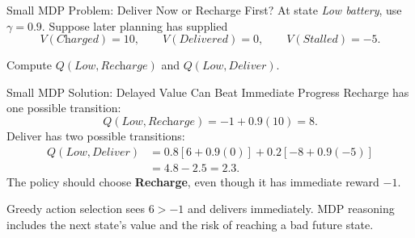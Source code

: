 \documentclass[aspectratio=169,10pt]{beamer}
\begin{document}
\begin{frame}{Small MDP Problem: Deliver Now or Recharge First?}
  At state \textit{Low battery}, use $\gamma=0.9$. Suppose later planning has supplied
  \[
    V(\textit{Charged})=10,\qquad V(\textit{Delivered})=0,\qquad V(\textit{Stalled})=-5.
  \]
  \begin{center}
  \end{center}
  Compute $Q(\textit{Low},\textit{Recharge})$ and $Q(\textit{Low},\textit{Deliver})$.
\end{frame}

\begin{frame}{Small MDP Solution: Delayed Value Can Beat Immediate Progress}
  \small
  Recharge has one possible transition:
  \[
    Q(\textit{Low},\textit{Recharge})=-1+0.9(10)=8.
  \]
  Deliver has two possible transitions:
  \[
  \begin{aligned}
    Q(\textit{Low},\textit{Deliver})
      &=0.8\left[6+0.9(0)\right]
        +0.2\left[-8+0.9(-5)\right]\\
      &=4.8-2.5=2.3.
  \end{aligned}
  \]
  The policy should choose \textbf{Recharge}, even though it has immediate reward $-1$.
  \begin{keyidea}
    Greedy action selection sees $6>-1$ and delivers immediately. MDP reasoning includes the next state's value and the risk of reaching a bad future state.
  \end{keyidea}
\end{frame}
\end{document}

